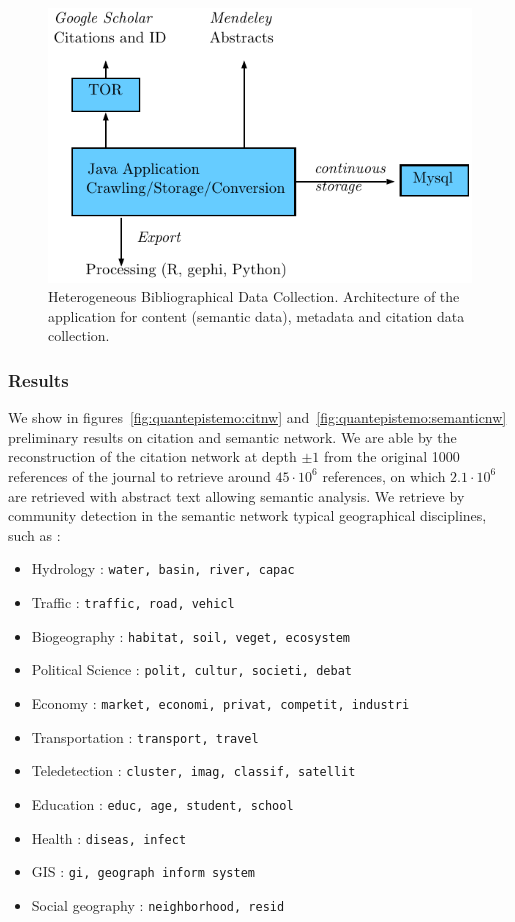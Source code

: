 \begin{figure}
\includegraphics[width=\textwidth]{Figures/PartI/QuantitativeEpistemo/HyperNetwork/archi}
\caption[Heterogeneous Bibliographical Data Collection]{Heterogeneous Bibliographical Data Collection. Architecture of the application for content (semantic data), metadata and citation data collection.}
\label{fig:quantepistemo:data}
\end{figure}


\subsubsection{Results}


We show in figures~\ref{fig:quantepistemo:citnw} and~\ref{fig:quantepistemo:semanticnw} preliminary results on citation and semantic network. We are able by the reconstruction of the citation network at depth $\pm 1$ from the original 1000 references of the journal to retrieve around $45\cdot 10^6$ references, on which $2.1\cdot 10^6$ are retrieved with abstract text allowing semantic analysis. We retrieve by community detection in the semantic network typical geographical disciplines, such as :

\begin{itemize}
\item Hydrology : \texttt{water, basin, river, capac}
\item Traffic : \texttt{traffic, road, vehicl}
\item Biogeography : \texttt{habitat, soil, veget, ecosystem}
\item Political Science : \texttt{polit, cultur, societi, debat}
\item Economy : \texttt{market, economi, privat, competit, industri}
\item Transportation : \texttt{transport, travel}
\item Teledetection : \texttt{cluster, imag, classif, satellit}
\item Education : \texttt{educ, age, student, school}
\item Health : \texttt{diseas, infect}
\item GIS : \texttt{gi, geograph inform system}
\item Social geography : \texttt{neighborhood, resid}
\end{itemize}



